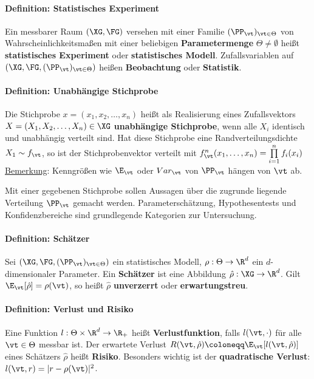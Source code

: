 \paragraph{Definition: Statistisches Experiment}
Ein messbarer Raum $(\XG,\FG)$ versehen mit einer Familie $(\PP_\vt)_{\vt\in\Theta}$ von Wahrscheinlichkeitsmaßen mit einer beliebigen \textbf{Parametermenge} $\Theta\neq\emptyset$ heißt \textbf{statistisches Experiment} oder \textbf{statistisches Modell}. 
Zufallsvariablen auf $(\XG,\FG,(\PP_\vt)_{\vt\in\Theta})$ heißen \textbf{Beobachtung} oder \textbf{Statistik}.

\paragraph{Definition: Unabhängige Stichprobe}
Die Stichprobe $x=(x_1,x_2,\ldots,x_n)$ heißt als Realisierung eines Zufallsvektors\\ 
$X=(X_1,X_2,\ldots,X_n)\in\XG$ \textbf{unabhängige Stichprobe}, wenn alle $X_i$ identisch und unabhängig verteilt sind.
Hat diese Stichprobe eine Randverteilungsdichte $X_1\sim f_\vt$, so ist der Stichprobenvektor verteilt mit $f_\vt^n(x_1,\ldots,x_n)=\prod\limits_{i=1}^{n}f_i(x_i)$\\

\underline{Bemerkung}: Kenngrößen wie $\E_\vt$ oder $Var_\vt$ von $\PP_\vt$ hängen von $\vt$ ab.

Mit einer gegebenen Stichprobe sollen Aussagen über die zugrunde liegende Verteilung $\PP_\vt$ gemacht werden.
Parameterschätzung, Hypothesentests und Konfidenzbereiche sind grundlegende Kategorien zur Untersuchung.

\paragraph{Definition: Schätzer}
Sei $(\XG,\FG,(\PP_\vt)_{\vt\in\Theta})$ ein statistisches Modell, $\rho:\Theta\rightarrow\R^d$ ein $d$-dimensionaler Parameter.
Ein \textbf{Schätzer} ist eine Abbildung $\hat{\rho}:\XG\rightarrow\R^d$.
Gilt $\E_\vt[\hat{\rho}]=\rho(\vt)$, so heißt $\hat{\rho}$ \textbf{unverzerrt} oder \textbf{erwartungstreu}.

\paragraph{Definition: Verlust und Risiko}
Eine Funktion $l:\Theta\times\R^d\rightarrow\R_+$ heißt \textbf{Verlustfunktion}, falls $l(\vt,\cdot)$ für alle $\vt\in\Theta$ messbar ist.
Der erwartete Verlust $R(\vt,\hat{\rho})\coloneqq\E_\vt[l(\vt,\hat{\rho})]$ eines Schätzers $\hat{\rho}$ heißt \textbf{Risiko}.
Besonders wichtig ist der \textbf{quadratische Verlust}: $l(\vt,r)=|r-\rho(\vt)|^2$.

